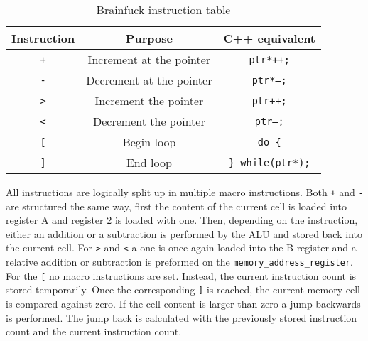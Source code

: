 \begin{table}[H]
\begin{center}
\begin{tabular}{ccc}
Instruction    & Purpose                  & C++ equivalent                       \\ \hline
\texttt{+}             & Increment at the pointer & \texttt{ptr*++;}                   \\
\texttt{-}               & Decrement at the pointer & \texttt{ptr*--;}                   \\
\texttt{\textgreater{}} & Increment the pointer    & \texttt{ptr++;}                    \\
\texttt{\textless{}}   & Decrement the pointer    & \texttt{ptr--;}                    \\
\texttt{{[}}            & Begin loop               & \texttt{do \{}                     \\
\texttt{{]}}            & End loop              & \texttt{\} while(ptr*);}
\end{tabular}
\end{center}
\caption{Brainfuck instruction table}
\label{tab:brainfuck-instructions}
\end{table}

All instructions are logically split up in multiple macro instructions. Both \texttt{+} and \texttt{-} are structured the same way, first the content of the current cell is loaded into register A and register 2 is loaded with one. Then, depending on the instruction, either an addition or a subtraction is performed by the ALU and stored back into the current cell. For \texttt{\textgreater} and \texttt{\textless} a one is once again loaded into the B register and a relative addition or subtraction is preformed on the \texttt{memory\_address\_register}. For the \texttt{{[}} no macro instructions are set. Instead, the current instruction count is stored temporarily. Once the corresponding \texttt{{]}} is reached, the current memory cell is compared against zero. If the cell content is larger than zero a jump backwards is performed. The jump back is calculated with the previously stored instruction count and the current instruction count.

